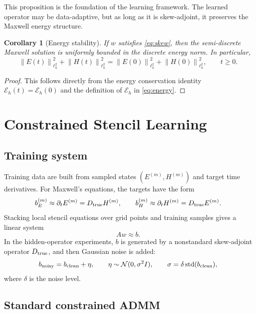 \documentclass[11pt]{article}
\newtheorem{corollary}[theorem]{Corollary}
\numberwithin{equation}{section}
\numberwithin{figure}{section}
\numberwithin{table}{section}
\newcommand{\Eh}{\mathcal E_h}
\newcommand{\norm}[2]{\left\|#1\right\|_{#2}}
\begin{document}
This proposition is the foundation of the learning framework. The learned
operator may be data-adaptive, but as long as it is skew-adjoint, it preserves
the Maxwell energy structure.
\begin{corollary}[Energy stability]
If $w$ satisfies \eqref{eq:skew}, then the semi-discrete Maxwell solution is
uniformly bounded in the discrete energy norm. In particular,
\[
  \norm{E(t)}{\ell^2_h}^2+\norm{H(t)}{\ell^2_h}^2
  =
  \norm{E(0)}{\ell^2_h}^2+\norm{H(0)}{\ell^2_h}^2,
  \qquad t\ge 0.
\]
\end{corollary}

\begin{proof}
This follows directly from the energy conservation identity
$\Eh(t)=\Eh(0)$ and the definition of $\Eh$ in \eqref{eq:energy}.
\end{proof}

\section{Constrained Stencil Learning}
\label{sec:learning}

\subsection{Training system}

Training data are built from sampled states $(E^{(m)},H^{(m)})$ and target
time derivatives. For Maxwell's equations, the targets have the form
\[
  b_E^{(m)}\approx \partial_t E^{(m)}=D_{\rm true}H^{(m)},\qquad
  b_H^{(m)}\approx \partial_t H^{(m)}=D_{\rm true}E^{(m)}.
\]
Stacking local stencil equations over grid points and training samples gives
a linear system
\begin{equation}
  Aw \approx b.
  \label{eq:Awb}
\end{equation}
In the hidden-operator experiments, $b$ is generated by a nonstandard
skew-adjoint operator $D_{\rm true}$, and then Gaussian noise is added:
\begin{equation}
  b_{\rm noisy}=b_{\rm clean}+\eta,\qquad
  \eta\sim \mathcal N(0,\sigma^2I),\qquad
  \sigma=\delta\,{\rm std}(b_{\rm clean}),
  \label{eq:noise}
\end{equation}
where $\delta$ is the noise level.

\subsection{Standard constrained ADMM}
\end{document}
